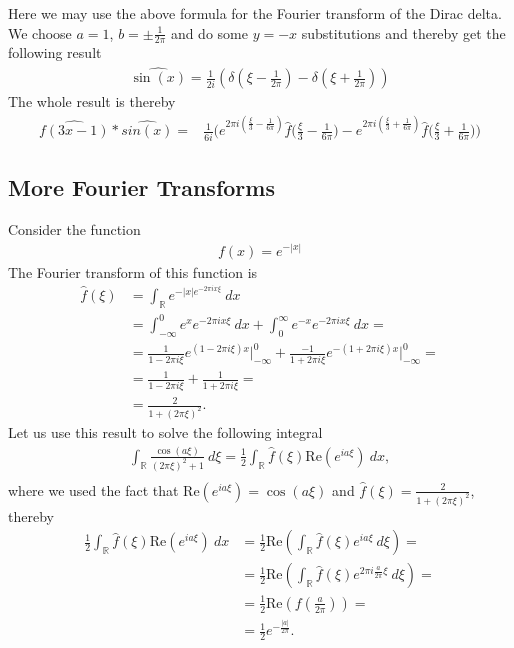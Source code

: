 Here we may use the above formula for the Fourier transform of the Dirac
delta. We choose $a=1$, $b= \pm \frac{1}{2\pi}$ and do some $y=-x$
substitutions and thereby get the following result
\begin{align}
    \widehat{\sin(x)} = \frac{1}{2i} \left(
        \delta(\xi - \frac{1}{2\pi})
        -\delta(\xi + \frac{1}{2\pi})
        \right)
\end{align}
The whole result is thereby
\begin{align}
    \widehat{f(3x-1)} * \widehat{sin(x)}
    =& \frac{1}{6i} \bigg(
        e^{2\pi
        i(\frac{\xi}{3}-\frac{1}{6\pi})}\hat{f}\big(\frac{\xi}{3}-\frac{1}{6\pi}\big)-
        e^{2\pi
            i(\frac{\xi}{3}+\frac{1}{6\pi})}\hat{f}\big(\frac{\xi}{3}+\frac{1}{6\pi}\big)
        \bigg)
\end{align}
\subsection{More Fourier Transforms}
Consider the function
\begin{align}
    f(x) = e^{-|x|}
\end{align}
The Fourier transform of this function is
\begin{align}
    \hat{f}(\xi)
    &=\int_\mathbb{R} e^{-|x| e^{-2\pi i x \xi}}\ dx\\
    &= \int_{-\infty}^0 e^x e^{-2\pi i x \xi}\ dx
    + \int_0^\infty e^{-x} e^{-2\pi i x \xi}\ dx=\\
    &= \frac{1}{1-2\pi i \xi} e^{(1-2\pi i \xi) x}\bigg|_{-\infty}^0+
        \frac{-1}{1+2\pi i \xi} e^{-(1+2\pi i \xi) x}\bigg|_{-\infty}^0 = \\
    &= \frac{1}{1-2\pi i \xi} + \frac{1}{1 + 2\pi i \xi} =\\
    &= \frac{2}{1+(2\pi \xi)^2}.
\end{align}
Let us use this result to solve the following integral
\begin{align}
    \int_\mathbb{R} \frac{\cos(a\xi)}{(2\pi \xi)^2 + 1}\ d\xi =
    \frac{1}{2}\int_\mathbb{R} \hat{f}(\xi) \text{Re}(e^{ia\xi})\ dx,\\
\end{align}
where we used the fact that $\text{Re}(e^{ia\xi}) = \cos(a\xi)$ and
$\hat{f}(\xi) = \frac{2}{1+(2\pi \xi)^2}$, thereby
\begin{align}
    \frac{1}{2}\int_\mathbb{R} \hat{f}(\xi) \text{Re}(e^{ia\xi})\ dx
    &= \frac{1}{2}\text{Re}\left(
        \int_\mathbb{R}\hat{f}(\xi)e^{ia\xi}\ d\xi
    \right)=\\
    &= \frac{1}{2}\text{Re}\left(
        \int_\mathbb{R} \hat{f}(\xi) e^{2\pi i \frac{a}{2\pi}\xi}\ d\xi
    \right)=\\
    &= \frac{1}{2}\text{Re}\left(f(\frac{a}{2\pi})\right)=\\
    &= \frac{1}{2} e^{-\frac{|a|}{2\pi}}.
\end{align}
